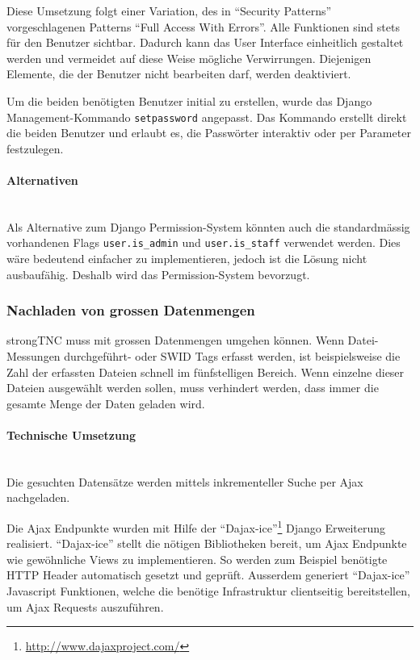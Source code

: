 Diese Umsetzung folgt einer Variation, des in \enquote{Security
Patterns}\cite{schumacher2013security} vorgeschlagenen Patterns \enquote{Full
Access With Errors}. Alle Funktionen sind stets für den Benutzer sichtbar.
Dadurch kann das User Interface einheitlich gestaltet werden und vermeidet auf
diese Weise mögliche Verwirrungen. Diejenigen Elemente, die der Benutzer nicht
bearbeiten darf, werden deaktiviert.

Um die beiden benötigten Benutzer initial zu erstellen, wurde das Django
Management-Kommando \texttt{setpassword} angepasst. Das Kommando erstellt direkt
die beiden Benutzer und erlaubt es, die Passwörter interaktiv oder per Parameter
festzulegen.

\paragraph{Alternativen} \hspace{0px} \\
Als Alternative zum Django Permission-System könnten auch die standardmässig
vorhandenen Flags \texttt{user.is\_admin} und \texttt{user.is\_staff} verwendet
werden. Dies wäre bedeutend einfacher zu implementieren, jedoch ist die Lösung
nicht ausbaufähig. Deshalb wird das Permission-System bevorzugt.

\subsubsection{Nachladen von grossen Datenmengen}
strongTNC muss mit grossen Datenmengen umgehen können. Wenn Datei-Messungen
durchgeführt- oder SWID Tags erfasst werden, ist beispielsweise die Zahl der
erfassten Dateien schnell im fünfstelligen Bereich. Wenn einzelne dieser Dateien
ausgewählt werden sollen, muss verhindert werden, dass immer die gesamte Menge
der Daten geladen wird.

\paragraph{Technische Umsetzung} \hspace{0pt} \\
Die gesuchten Datensätze werden mittels inkrementeller Suche per Ajax
nachgeladen.

Die Ajax Endpunkte wurden mit Hilfe der \enquote{Dajax-ice}\footnote{\url{http://www.dajaxproject.com/}} Django Erweiterung realisiert.
\enquote{Dajax-ice} stellt die nötigen Bibliotheken bereit, um Ajax Endpunkte wie gewöhnliche Views zu implementieren. So werden zum Beispiel benötigte HTTP Header
automatisch gesetzt und geprüft. Ausserdem generiert \enquote{Dajax-ice} Javascript Funktionen, welche die benötige Infrastruktur clientseitig bereitstellen, um Ajax Requests auszuführen.
\\

